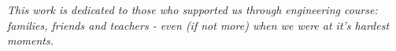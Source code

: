 \begin{dedication}
   \vspace*{\fill}
   \centering
   \noindent
   \textit{ This work is dedicated to those who supported us through engineering
   course: families, friends and teachers - even (if not more) when we
   were at it's hardest moments.  } \vspace*{\fill}
\end{dedication}
